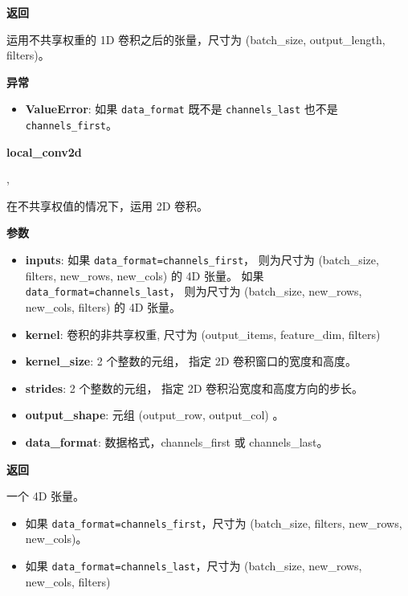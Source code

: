 \textbf{返回}

运用不共享权重的 1D 卷积之后的张量，尺寸为 (batch\_size, output\_length,
filters)。

\textbf{异常}

\begin{itemize}
\tightlist
\item
  \textbf{ValueError}: 如果 \texttt{data\_format} 既不是
  \texttt{channels\_last} 也不是 \texttt{channels\_first}。
\end{itemize}


\textbf{local\_conv2d}\label{localux5fconv2d}

\begin{Shaded}
\begin{Highlighting}[]
,\\
\hspace{3cm}\OperatorTok{=}\NormalTok{)}
\end{Highlighting}
\end{Shaded}

在不共享权值的情况下，运用 2D 卷积。

\textbf{参数}

\begin{itemize}
\tightlist
\item
  \textbf{inputs}: 如果
  \texttt{data\_format=\textquotesingle{}channels\_first\textquotesingle{}}，
  则为尺寸为 (batch\_size, filters, new\_rows, new\_cols) 的 4D 张量。
  如果
  \texttt{data\_format=\textquotesingle{}channels\_last\textquotesingle{}}，
  则为尺寸为 (batch\_size, new\_rows, new\_cols, filters) 的 4D 张量。
\item
  \textbf{kernel}: 卷积的非共享权重, 尺寸为 (output\_items,
  feature\_dim, filters)
\item
  \textbf{kernel\_size}: 2 个整数的元组， 指定 2D 卷积窗口的宽度和高度。
\item
  \textbf{strides}: 2 个整数的元组， 指定 2D
  卷积沿宽度和高度方向的步长。
\item
  \textbf{output\_shape}: 元组 (output\_row, output\_col) 。
\item
  \textbf{data\_format}: 数据格式，channels\_first 或 channels\_last。
\end{itemize}

\textbf{返回}

一个 4D 张量。

\begin{itemize}
\tightlist
\item
  如果
  \texttt{data\_format=\textquotesingle{}channels\_first\textquotesingle{}}，尺寸为
  (batch\_size, filters, new\_rows, new\_cols)。
\item
  如果
  \texttt{data\_format=\textquotesingle{}channels\_last\textquotesingle{}}，尺寸为
  (batch\_size, new\_rows, new\_cols, filters)
\end{itemize}

